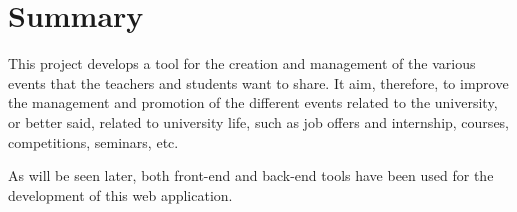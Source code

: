 

\chapter*{Summary}

This project develops a tool for the creation and management of the various events that the teachers and students want to share. It aim, therefore, to improve the management and promotion of the different events related to the university, or better said, related to university life, such as job offers and internship, courses, competitions, seminars, etc.


As will be seen later, both front-end and back-end tools have been used for the development of this web application.

